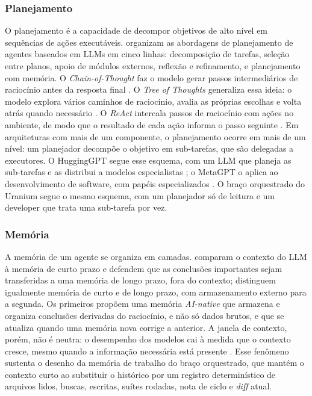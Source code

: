 \subsubsection{Planejamento}

O planejamento é a capacidade de decompor objetivos de alto nível em sequências de ações executáveis. \cite{Huang2024Planning} organizam as abordagens de planejamento de agentes baseados em LLMs em cinco linhas: decomposição de tarefas, seleção entre planos, apoio de módulos externos, reflexão e refinamento, e planejamento com memória. O \textit{Chain-of-Thought} faz o modelo gerar passos intermediários de raciocínio antes da resposta final \citep{Wei2022CoT}. O \textit{Tree of Thoughts} generaliza essa ideia: o modelo explora vários caminhos de raciocínio, avalia as próprias escolhas e volta atrás quando necessário \citep{Yao2023ToT}. O \textit{ReAct} intercala passos de raciocínio com ações no ambiente, de modo que o resultado de cada ação informa o passo seguinte \citep{Yao2023ReAct}. Em arquiteturas com mais de um componente, o planejamento ocorre em mais de um nível: um planejador decompõe o objetivo em sub-tarefas, que são delegadas a executores. O HuggingGPT segue esse esquema, com um LLM que planeja as sub-tarefas e as distribui a modelos especialistas \citep{Shen2023HuggingGPT}; o MetaGPT o aplica ao desenvolvimento de software, com papéis especializados \citep{MetaGPT2023}. O braço orquestrado do Uranium segue o mesmo esquema, com um planejador só de leitura e um developer que trata uma sub-tarefa por vez.

\subsubsection{Memória}

A memória de um agente se organiza em camadas. \cite{AINativeMemory2024} comparam o contexto do LLM à memória de curto prazo e defendem que as conclusões importantes sejam transferidas a uma memória de longo prazo, fora do contexto; \cite{Harmony2025} distinguem igualmente memória de curto e de longo prazo, com armazenamento externo para a segunda. Os primeiros propõem uma memória \textit{AI-native} que armazena e organiza conclusões derivadas do raciocínio, e não só dados brutos, e que se atualiza quando uma memória nova corrige a anterior. A janela de contexto, porém, não é neutra: o desempenho dos modelos cai à medida que o contexto cresce, mesmo quando a informação necessária está presente \citep{Levy2024SameTask, Liu2024LostInTheMiddle, Hsieh2024RULER, Modarressi2025NoLiMa}. Esse fenômeno sustenta o desenho da memória de trabalho do braço orquestrado, que mantém o contexto curto ao substituir o histórico por um registro determinístico de arquivos lidos, buscas, escritas, suítes rodadas, nota de ciclo e \textit{diff} atual.

